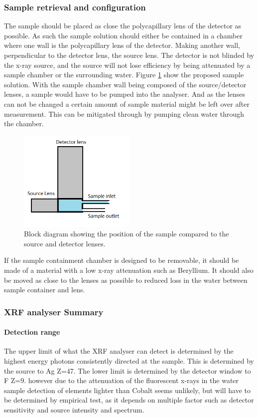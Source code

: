 \subsubsection{Sample retrieval and configuration}
The sample should be placed as close the polycapillary lens of the detector as possible. As such the sample solution should either be contained in a chamber where one wall is the polycapillary lens of the detector. 
Making another wall, perpendicular to the detector lens, the source lens. The detector is not blinded by the x-ray source, and the source will not lose efficiency by being attenuated by a sample chamber or the surrounding water. Figure \ref{fig:XRFSampleDiagram} show the proposed sample solution. With the sample chamber wall being composed of the source/detector lenses, a sample would have to be pumped into the analyser. And as the lenses can not be changed a certain amount of sample material might be left over after measurement. This can be mitigated through by pumping clean water through the chamber.

\begin{figure}[htb]
	\centering
	\includegraphics[width=0.5\textwidth]{figures/XRF/SampleDiagram.png}
	\caption{Block diagram showing the position of the sample compared to the source and detector lenses.}
	\label{fig:XRFSampleDiagram}
\end{figure}

If the sample containment chamber is designed to be removable, it should be made of a material with a low x-ray attenuation such as Beryllium. It should also be moved as close to the lenses as possible to reduced loss in the water between sample container and lens.

\subsubsection{XRF analyser Summary}

\paragraph{Detection range} The upper limit of what the XRF analyser can detect is determined by the highest energy photons consistently directed at the sample. This is determined by the source to Ag Z=47.
The lower limit is determined by the detector window to F Z=9. however due to the attenuation of the fluorescent x-rays in the water sample detection of elements lighter than Cobalt seems unlikely, but will have to be determined by empirical test, as it depends on multiple factor such as detector sensitivity and source intensity and spectrum.

